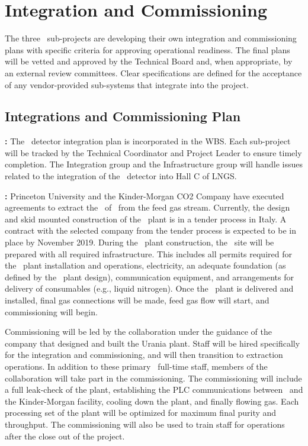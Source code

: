 \section{Integration and Commissioning}

The three \DS\ sub-projects are developing their own integration and commissioning plans with specific criteria for approving operational readiness. The final plans will be vetted and approved by the Technical Board and, when appropriate, by an external review committees. Clear specifications are defined for the acceptance of any vendor-provided sub-systems that integrate into the project.


\subsection{Integrations and Commissioning Plan}
\textbf{\DSks:} The \DSks\ detector integration plan is incorporated in the WBS. Each sub-project will be tracked by the Technical Coordinator and Project Leader to ensure timely completion. The Integration group and the Infrastructure group will handle issues related to the integration of the \DSks\ detector into Hall C of LNGS. 

\textbf{\Urania:} Princeton University and the Kinder-Morgan CO2 Company have executed agreements to extract the \UraniaTotalDSkProduction\ of \UAr\ from the feed gas stream. Currently, the design and skid mounted construction of the \Urania\ plant is in a tender process in Italy. A contract with the selected company from the tender process is expected to be in place by November 2019. During  the \Urania\ plant construction, the \Urania\ site will be prepared with all required infrastructure. This includes all permits required for the \Urania\ plant installation and operations, electricity, an adequate foundation (as defined by the \Urania\ plant design), communication equipment,  and arrangements for delivery of consumables (e.g., liquid nitrogen). Once the \Urania\ plant is delivered and installed, final gas connections will be made, feed gas flow will start, and commissioning will begin.

Commissioning will be led by the collaboration under the guidance of the company that designed and built the Urania plant. Staff will be hired specifically for the integration and commissioning, and will then transition to extraction operations. In addition to these primary \Urania\ full-time staff, members of the collaboration will take part in the commissioning. The commissioning will include a full leak-check of the plant, establishing the PLC communications between \Urania\ and the Kinder-Morgan facility, cooling down the plant, and finally flowing gas. Each processing set of the plant will be optimized for maximum final purity and throughput. The commissioning will also be used to train staff for operations after the close out of the project.

